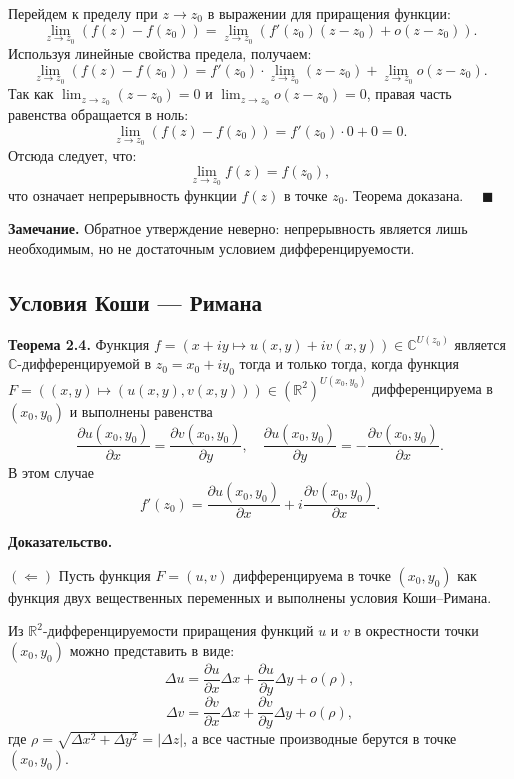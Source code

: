 \documentclass[12pt, a4paper]{article}
\theoremstyle{definition}
\theoremstyle{remark}
\begin{document}
Перейдем к пределу при $z \to z_0$ в выражении для приращения функции:
\[
\lim_{z \to z_0} \left( f(z) - f(z_0) \right) = \lim_{z \to z_0} \left( f'(z_0)(z - z_0) + o(z - z_0) \right).
\]
Используя линейные свойства предела, получаем:
\[
\lim_{z \to z_0} \left( f(z) - f(z_0) \right) = f'(z_0) \cdot \lim_{z \to z_0} (z - z_0) + \lim_{z \to z_0} o(z - z_0).
\]
Так как $\lim_{z \to z_0} (z - z_0) = 0$ и $\lim_{z \to z_0} o(z - z_0) = 0$, правая часть равенства обращается в ноль:
\[
\lim_{z \to z_0} \left( f(z) - f(z_0) \right) = f'(z_0) \cdot 0 + 0 = 0.
\]
Отсюда следует, что:
\[
\lim_{z \to z_0} f(z) = f(z_0),
\]
что означает непрерывность функции $f(z)$ в точке $z_0$. Теорема доказана. $\quad \blacksquare$

\textbf{Замечание.} Обратное утверждение неверно: непрерывность является лишь необходимым, но не достаточным условием дифференцируемости.

\subsection{Условия Коши --- Римана}

\textbf{Теорема 2.4.} Функция $f = (x + iy \mapsto u(x,y) + iv(x,y)) \in \mathbb{C}^{U(z_0)}$ является $\mathbb{C}$-дифференцируемой в $z_0 = x_0 + iy_0$ тогда и только тогда, когда функция $F = ((x,y) \mapsto (u(x,y), v(x,y))) \in (\mathbb{R}^2)^{U(x_0,y_0)}$ дифференцируема в $(x_0,y_0)$ и выполнены равенства
\[
\frac{\partial u(x_0, y_0)}{\partial x} = \frac{\partial v(x_0, y_0)}{\partial y}, \quad \frac{\partial u(x_0, y_0)}{\partial y} = -\frac{\partial v(x_0, y_0)}{\partial x}.
\]
В этом случае
\[
f'(z_0) = \frac{\partial u(x_0, y_0)}{\partial x} + i \frac{\partial v(x_0, y_0)}{\partial x}.
\]

\textbf{Доказательство.} 

$(\Leftarrow)$ Пусть функция $F = (u, v)$ дифференцируема в точке $(x_0, y_0)$ как функция двух вещественных переменных и выполнены условия Коши–Римана. 

Из $\mathbb{R}^2$-дифференцируемости приращения функций $u$ и $v$ в окрестности точки $(x_0, y_0)$ можно представить в виде:
\[
\Delta u = \frac{\partial u}{\partial x}\Delta x + \frac{\partial u}{\partial y}\Delta y + o(\rho),
\]
\[
\Delta v = \frac{\partial v}{\partial x}\Delta x + \frac{\partial v}{\partial y}\Delta y + o(\rho),
\]
где $\rho = \sqrt{\Delta x^2 + \Delta y^2} = |\Delta z|$, а все частные производные берутся в точке $(x_0, y_0)$.
\end{document}

